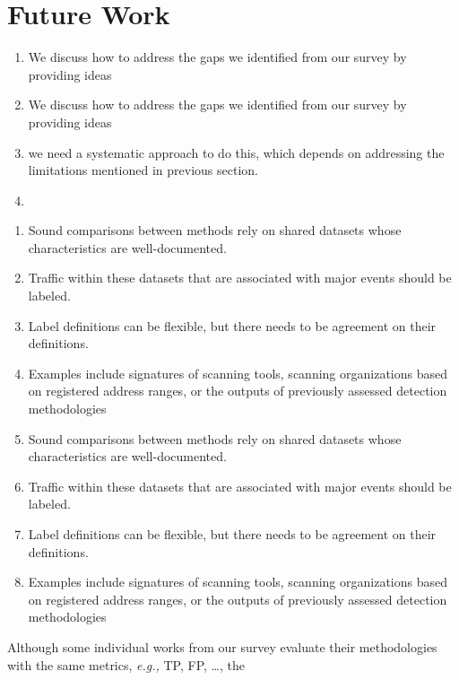 \documentclass[manuscript,nonacm]{acmart}
\begin{document}
\label{sec:fw}
\section{Future Work}

\begin{enumerate}
    \item We discuss how to address the gaps we identified from our survey by providing ideas 
    \item We discuss how to address the gaps we identified from our survey by providing ideas 
    \item we need a systematic approach to do this, which depends on addressing the limitations mentioned in previous section.
    \item 
\end{enumerate}

\begin{enumerate}
    \item Sound comparisons between methods rely on shared datasets whose characteristics are well-documented.
    \item Traffic within these datasets that are associated with major events should be labeled.
    \item Label definitions can be flexible, but there needs to be agreement on their definitions.
    \item Examples include signatures of scanning tools, scanning organizations based on registered address ranges, or the outputs of previously assessed detection methodologies
    \item Sound comparisons between methods rely on shared datasets whose characteristics are well-documented.
    \item Traffic within these datasets that are associated with major events should be labeled.
    \item Label definitions can be flexible, but there needs to be agreement on their definitions.
    \item Examples include signatures of scanning tools, scanning organizations based on registered address ranges, or the outputs of previously assessed detection methodologies
\end{enumerate}


Although some individual works from our survey evaluate their methodologies with the same metrics, \textit{e.g.,} TP, FP, \dots, 
the
\end{document}
